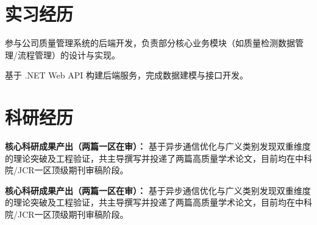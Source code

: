 \documentclass[]{deedy-resume-openfont}
\begin{document}
\begin{minipage}[t]{0.66\textwidth} 

\section{实习经历}

\vspace{\topsep} %
\begin{tightemize}
\item 参与公司质量管理系统的后端开发，负责部分核心业务模块（如质量检测数据管理/流程管理）的设计与实现。
\item 基于 .NET Web API 构建后端服务，完成数据建模与接口开发。
\end{tightemize}
\sectionsep




\section{科研经历}

\vspace{\topsep}
\begin{tightemize}
\item \textbf{核心科研成果产出（两篇一区在审）：} 基于异步通信优化与广义类别发现双重维度的理论突破及工程验证，共主导撰写并投递了两篇高质量学术论文，目前均在中科院/JCR一区顶级期刊审稿阶段。
\item \textbf{核心科研成果产出（两篇一区在审）：} 基于异步通信优化与广义类别发现双重维度的理论突破及工程验证，共主导撰写并投递了两篇高质量学术论文，目前均在中科院/JCR一区顶级期刊审稿阶段。
\end{tightemize}
\sectionsep


\end{minipage}
\end{document}

